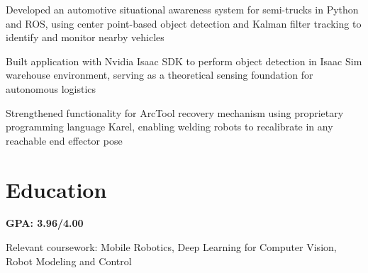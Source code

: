 \documentclass{resume}
\begin{document}
\begin{details}
\item Developed an automotive situational awareness system for semi-trucks in Python and
  ROS, using center point-based object detection and Kalman filter tracking to identify
  and monitor nearby vehicles
\item Built application with Nvidia Isaac SDK to perform object detection in Isaac Sim
  warehouse environment, serving as a theoretical sensing foundation for autonomous logistics
\end{details}

\begin{details}
\item Strengthened functionality for ArcTool recovery mechanism using proprietary
  programming language Karel, enabling welding robots to recalibrate in any reachable end
  effector pose
\end{details}


\section{Education}

\begin{details}
\item \textbf{GPA: 3.96/4.00}
\item Relevant coursework: Mobile Robotics, Deep Learning for Computer Vision, Robot
  Modeling and Control
\end{details}
\end{document}

